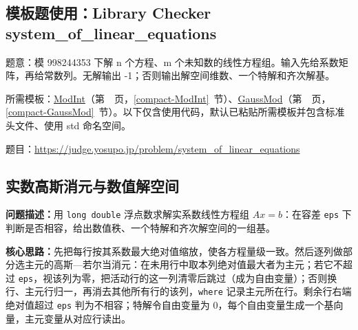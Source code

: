 \Needspace{519pt}



\newpage



\Needspace{441pt}

\subsection*{模板题使用：Library Checker system\_of\_linear\_equations}

\label{usage-example-24}

题意：模 998244353 下解 n 个方程、m 个未知数的线性方程组。输入先给系数矩阵，再给常数列。无解输出 -1；否则输出解空间维数、一个特解和齐次解基。

所需模板：\hyperref[compact-ModInt]{ModInt}（第~\pageref{compact-ModInt}~页，\ref{compact-ModInt}~节）、\hyperref[compact-GaussMod]{GaussMod}（第~\pageref{compact-GaussMod}~页，\ref{compact-GaussMod}~节）。以下仅含使用代码，默认已粘贴所需模板并包含标准头文件、使用 std 命名空间。

题目：\url{https://judge.yosupo.jp/problem/system_of_linear_equations}



\newpage

\Needspace{667pt}

\subsection{实数高斯消元与数值解空间}\label{compact-GaussReal}

\noindent\textbf{问题描述：}\allowbreak 用 \texttt{long double} 浮点数求解实系数线性方程组 $Ax=b$：在容差 \texttt{eps} 下判断是否相容，给出数值秩、一个特解和齐次解空间的一组基。

\textbf{核心思路：}\allowbreak 先把每行按其系数最大绝对值缩放，使各方程量级一致。然后逐列做部分选主元的高斯—若尔当消元：在未用行中取本列绝对值最大者为主元；若它不超过 \texttt{eps}，视该列为零，把活动行的这一列清零后跳过（成为自由变量）；否则换行、主元行归一，再消去其他所有行的该列，\texttt{where} 记录主元所在行。剩余行右端绝对值超过 \texttt{eps} 判为不相容；特解令自由变量为 0，每个自由变量生成一个基向量，主元变量从对应行读出。



